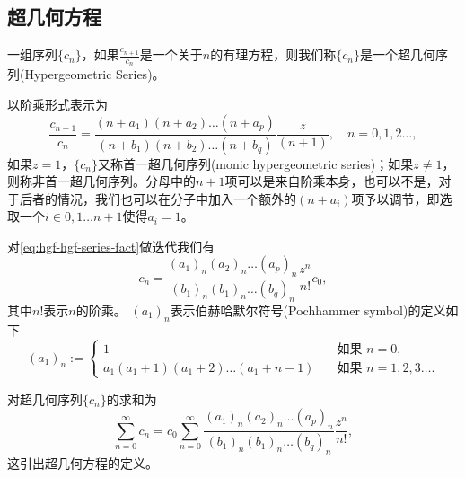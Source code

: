 \begin{subappendices}

  \section{超几何方程}
  \label{sec:hypergeometricfunctions}
  \begin{definition}[超几何序列]
    一组序列$\{c_n\}$，如果$\frac{c_{n+1}}{c_{n}}$是一个关于$n$的有理方程，则我们称$\{c_n\}$是一个超几何序列(Hypergeometric Series)。
  \end{definition}

以阶乘形式表示为
\begin{equation}
\label{eq:hgf-hgf-series-fact}
\frac{c_{n+1}}{c_{n}} = \frac{\left(n+a_1\right) \left(n+a_2\right) \ldots \left(n+a_p\right)}{\left(n+b_1\right) \left(n+b_2\right) \ldots \left(n+b_q\right)} \frac{z}{\left(n+1\right)}, \quad n=0,1,2\ldots,
\end{equation}
如果$z=1$，$\{c_n\}$又称首一超几何序列(monic hypergeometric series)；如果$z \neq 1$，则称非首一超几何序列。分母中的$n+1$项可以是来自阶乘本身，也可以不是，对于后者的情况，我们也可以在分子中加入一个额外的$(n+a_i)$项予以调节，即选取一个$i \in 0,1 \ldots n+1$使得$a_i = 1$。

对\eqref{eq:hgf-hgf-series-fact}做迭代我们有
\begin{equation}
\label{eq:hgf-hgf-series-iteration}
c_n = \frac{\left(a_1\right)_n \left(a_2\right)_n \ldots \left(a_p\right)_n}{\left(b_1\right)_n \left(b_1\right)_n \ldots \left(b_q\right)_n} \frac{z^n}{n!} c_0,
\end{equation}
其中$n!$表示$n$的阶乘。 $\left(a_1 \right)_n$表示伯赫哈默尔符号(Pochhammer symbol)的定义如下
\begin{equation*}
  \left(a_1 \right)_n := \begin{cases}
  1 & \quad \text{如果 } n=0,\\
   a_1 (a_1 + 1) (a_1 + 2) \ldots (a_1 + n -1) & \quad \text{如果 }n=1,2,3 \ldots.
  \end{cases}
\end{equation*}

对超几何序列$\{c_n\}$的求和为
\begin{equation*}
  \sum_{n=0}^{\infty} c_n = c_0 \sum_{n=0}^{\infty}  \frac{\left(a_1\right)_n \left(a_2\right)_n \ldots \left(a_p\right)_n}{\left(b_1\right)_n \left(b_1\right)_n \ldots \left(b_q\right)_n} \frac{z^n}{n!},
\end{equation*}
这引出超几何方程的定义。


\end{subappendices}

